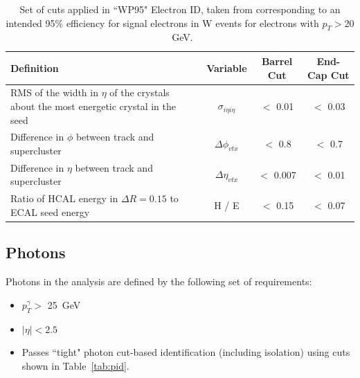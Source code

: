 \begin{table}[htbp]
\centering
\begin{tabular}{ m{6.9cm}  c  c  c}
\hline
\hline
 \centering Definition & Variable & Barrel Cut & End-Cap Cut \\
\hline
\hline
RMS of the width in $\eta$ of the crystals about the most energetic crystal in the seed& $\sigma_{i \eta i \eta}$ & $<$ 0.01 & $<$ 0.03\\
Difference in $\phi$ between track and supercluster&$\Delta \phi_{vtx}$& $<$ 0.8 & $<$ 0.7 \\
Difference in $\eta$ between track and supercluster& $\Delta \eta_{vtx}$& $<$ 0.007 & $<$ 0.01\\
Ratio of HCAL energy in $\Delta R = 0.15$ to ECAL seed energy & H / E & $<$ 0.15 & $<$ 0.07\\
\hline
\end{tabular}
\caption{\label{tab:eid} Set of cuts applied in ``WP95" Electron ID, taken from \cite{AN-10-116} corresponding to an intended 95\% efficiency for signal electrons in W events for electrons with $p_{T} > 20$~GeV.}
\end{table}
\subsection{Photons}

Photons in the analysis are defined by the following set of requirements:
\begin{itemize}
\item $p_{T}^{\gamma} > $ 25~GeV
\item $|\eta| < 2.5$
\item Passes ``tight" photon cut-based identification (including isolation) using cuts shown in Table~\ref{tab:pid}.
\end{itemize}



